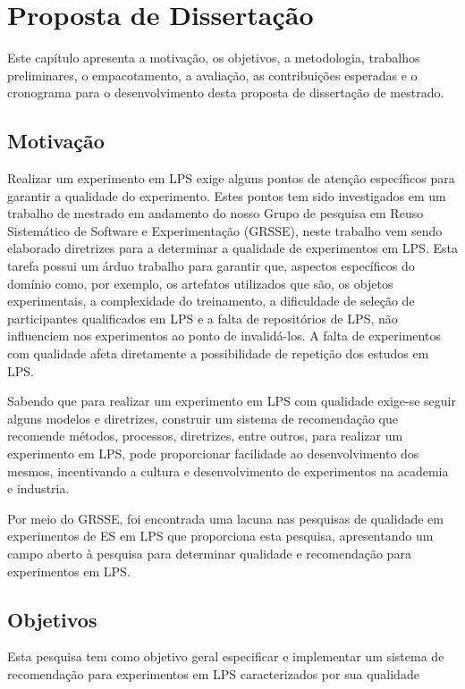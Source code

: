 \chapter{Proposta de Dissertação}
\label{sec:prop_sis_rec_exp}

Este capítulo apresenta a motivação, os objetivos, a metodologia, trabalhos preliminares, o empacotamento, a avaliação, as contribuições esperadas e o cronograma para o desenvolvimento desta proposta de dissertação de mestrado.

\section{Motivação}
\label{sec:moti}
Realizar um experimento em LPS exige alguns pontos de atenção específicos para garantir a qualidade do experimento. Estes pontos tem sido investigados em um trabalho de mestrado em andamento do nosso Grupo de pesquisa em Reuso Sistemático de Software e Experimentação (GRSSE), neste trabalho vem sendo elaborado diretrizes para a determinar a qualidade de experimentos em LPS. Esta tarefa possui um árduo trabalho para garantir que, aspectos específicos do domínio como, por exemplo, os artefatos utilizados que são, os objetos experimentais, a complexidade do treinamento, a dificuldade de seleção de participantes qualificados em LPS e a falta de repositórios de LPS, não influenciem nos experimentos ao ponto de invalidá-los. A falta de experimentos com qualidade afeta diretamente a possibilidade de repetição dos estudos em LPS.

Sabendo que para realizar um experimento em LPS com qualidade exige-se seguir alguns modelos e diretrizes, construir um sistema de recomendação que recomende métodos, processos, diretrizes, entre outros, para realizar um experimento em LPS, pode proporcionar facilidade ao desenvolvimento dos mesmos, incentivando a cultura e desenvolvimento de experimentos na academia e industria.

Por meio do GRSSE, foi encontrada uma lacuna nas pesquisas de qualidade em experimentos de ES em LPS que proporciona esta pesquisa, apresentando um campo aberto à pesquisa para determinar qualidade e recomendação para experimentos em LPS.


\section{Objetivos}
\label{sec:obj}

Esta pesquisa tem como objetivo geral especificar e implementar um sistema de recomendação para experimentos em LPS caracterizados por sua qualidade

